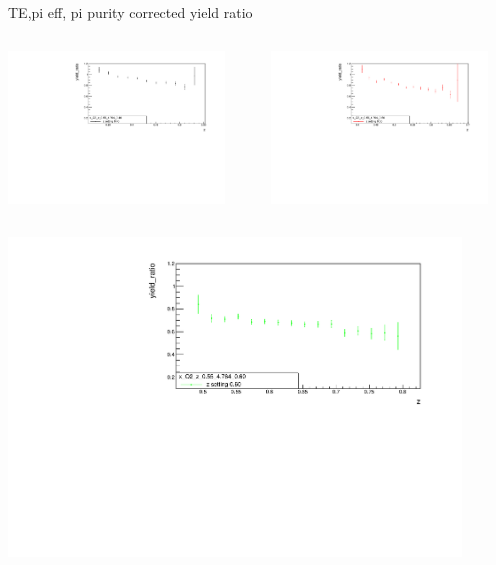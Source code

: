 \begin{frame}{TE,pi eff, pi purity corrected yield ratio}
\begin{columns}
\begin{column}[T]{0.5\textwidth}
\includegraphics[width = 0.9\textwidth]{results/yield/statistics_corr/x_Q2_z_0.55_4.764_0.40_ratio.pdf}
\end{column}
\begin{column}[T]{0.5\textwidth}
\includegraphics[width = 0.9\textwidth]{results/yield/statistics_corr/x_Q2_z_0.55_4.764_0.50_ratio.pdf}
\end{column}
\end{columns}
\begin{columns}
\begin{column}[T]{0.5\textwidth}
\includegraphics[width = 0.9\textwidth]{results/yield/statistics_corr/x_Q2_z_0.55_4.764_0.60_ratio.pdf}

\end{column}
\end{columns}
\end{frame}
